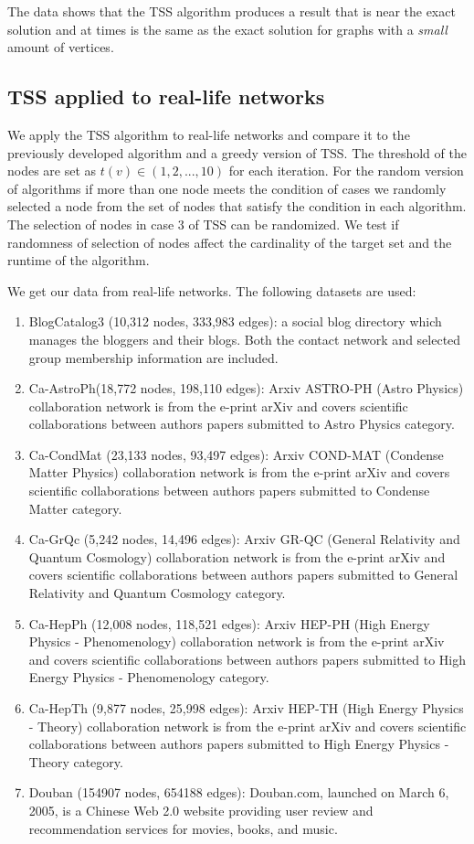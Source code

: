 The data shows that the TSS algorithm produces a result that is near the exact solution and at times is the same as the exact solution for graphs with a \textit{small} amount of vertices.

\subsection{TSS applied to real-life networks}

We apply the TSS algorithm to real-life networks and compare it to the previously developed algorithm and a greedy version of TSS. The threshold of the nodes are set as $t(v)\in(1,2,...,10)$ for each iteration. For the random version of algorithms if more than one node meets the condition of cases we randomly selected a node from the set of nodes that satisfy the condition in each algorithm. The selection of nodes in case 3 of TSS can be randomized. We test if randomness of selection of nodes affect the cardinality of the target set and the runtime of the algorithm.

We get our data from real-life networks\cite{datasets1}\cite{datasets2}. The following datasets are used:
\begin{enumerate}
	\item BlogCatalog3 (10,312 nodes, 333,983 edges): a social blog directory which manages the bloggers and their blogs. Both the contact network and selected group membership information are included.
	\item Ca-AstroPh(18,772 nodes, 198,110 edges): Arxiv ASTRO-PH (Astro Physics) collaboration network is from the e-print arXiv and covers scientific collaborations between authors papers submitted to Astro Physics category.
	\item Ca-CondMat (23,133 nodes, 93,497 edges): Arxiv COND-MAT (Condense Matter Physics) collaboration network is from the e-print arXiv and covers scientific collaborations between authors papers submitted to Condense Matter category.
	\item Ca-GrQc (5,242 nodes, 14,496 edges): Arxiv GR-QC (General Relativity and Quantum Cosmology) collaboration network is from the e-print arXiv and covers scientific collaborations between authors papers submitted to General Relativity and Quantum Cosmology category. 
	\item Ca-HepPh (12,008 nodes, 118,521 edges): Arxiv HEP-PH (High Energy Physics - Phenomenology) collaboration network is from the e-print arXiv and covers scientific collaborations between authors papers submitted to High Energy Physics - Phenomenology category.
	\item Ca-HepTh (9,877 nodes, 25,998 edges): Arxiv HEP-TH (High Energy Physics - Theory) collaboration network is from the e-print arXiv and covers scientific collaborations between authors papers submitted to High Energy Physics - Theory category. 
	\item Douban (154907 nodes, 654188 edges):
	 Douban.com, launched on March 6, 2005, is a Chinese Web 2.0 website providing user review and recommendation services for movies, books, and music.
\end{enumerate}

